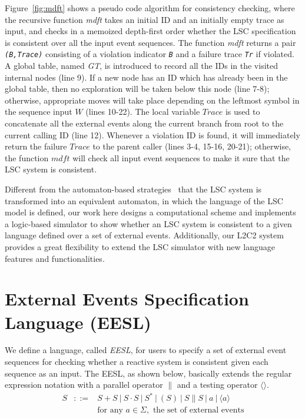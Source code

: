 \documentclass[]{llncs}
\begin{document}
Figure~\ref{fig:mdft} shows a pseudo code algorithm for consistency checking,
where the recursive function {\em mdft}
takes an initial ID and an initially empty trace as input,
and checks in a memoized depth-first order whether the LSC
specification is consistent over all
the input event sequences.
The function {\em mdft} returns a pair {\tt\em (B,Trace)}
consisting of a violation indicator {\tt\em B} and a failure
trace {\tt\em Tr} if violated.
A global table, named {\em GT}, is
introduced to record all the IDs in the visited internal nodes
(line 9). If a new node has an ID which has already
been in the global table, then no exploration will be taken below
this node (line 7-8); otherwise, appropriate moves will take place
depending on the leftmost symbol in the sequence input $W$ (lines 10-22).
The local variable $Trace$ is used to concatenate all the external
events along the current branch from root to
the current calling ID (line 12).
Whenever a violation ID is found, it will immediately return the failure
$Trace$ to the parent caller (lines 3-4, 15-16, 20-21);
otherwise, the function $mdft$ will check all input event sequences
to make it sure that the LSC system is consistent.

Different from the automaton-based strategies~\cite{HK99,BH01,KTWW06,KM08}
that the LSC system is transformed into an equivalent automaton, in which the
language of the LSC model is defined, our work here designs a
computational scheme and implements a logic-based simulator to show whether
an LSC system is consistent to a given language defined over a set of external events.
Additionally, our L2C2 system provides a great flexibility to extend the LSC
simulator with new language features and functionalities.

\section{External Events Specification Language (EESL)}
\label{sec:eesl}

We define a language, called {\em EESL}, for users to specify a set of external
event sequences for checking whether a reactive system is consistent given each
sequence as an input. The EESL, as shown below, basically extends the regular
expression notation with a parallel operator $\|$ and
a testing operator $\langle\rangle$.
\begin{eqnarray*}
S & ::= & S+S\ |\ S\cdot S\ |\ {S}^{*}\ |\ (S)\ |\ S \| S\ |\ a\ |\ \langle a \rangle  \\
 & & \mbox{for any }a \in \Sigma, \mbox{ the set of external events}
\end{eqnarray*}
\end{document}
